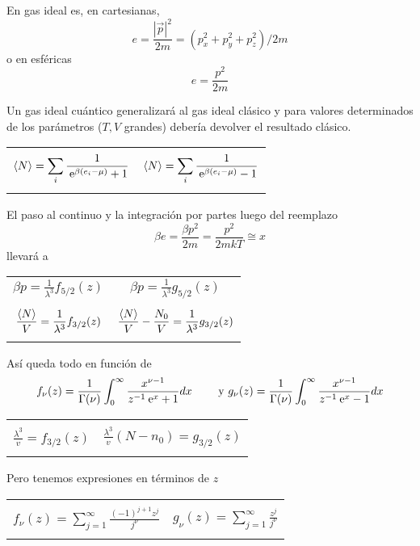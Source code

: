 \documentclass[10pt,oneside]{CBFT_book}
\begin{document}
En gas ideal es, en cartesianas, 
\[
	e = \frac{|\vec{p}|^2}{2m} = ( p_x^2 + p_y^2 + p_z^2 )/2m 
\]
o en esféricas
\[
	e = \frac{p^2}{2m} 
\]

Un gas ideal cuántico generalizará al gas ideal clásico y para valores determinados de los
parámetros ($T,V$ grandes) debería devolver el resultado clásico.
\begin{center}
\begin{tabular}{c|c}
  & \\
$ \displaystyle \braket{N} = \sum_i \frac{1}{\:\mathrm{e}^{\beta(e_i - \mu)} + 1} $ & 
$ \displaystyle \braket{N} = \sum_i \frac{1}{\:\mathrm{e}^{\beta(e_i - \mu)} - 1} $ \\
  & 
\end{tabular}
\end{center}

El paso al continuo y la integración por partes luego del reemplazo
\[
	\beta e = \frac{\beta p^2}{2m} = \frac{p^2}{2mkT} \cong x
\]
llevará a 
\begin{center}
\begin{tabular}{c|c}
$ \displaystyle \beta p = \frac{1}{\lambda^3} f_{5/2}(z) $ & 
$ \displaystyle \beta p = \frac{1}{\lambda^3} g_{5/2}(z) $ \\
  & \\
$ \displaystyle \frac{\braket{N}}{V} = \frac{1}{\lambda^3} f_{3/2}(z) $ & 
$ \displaystyle \frac{\braket{N}}{V} - \frac{N_0}{V}= \frac{1}{\lambda^3} g_{3/2}(z) $ \\
  & 
\end{tabular}
\end{center}


Así queda todo en función de 
\[
	f_\nu(z) = \frac{1}{\Gamma(\nu)} \int_0^\infty \frac{x^{\nu-1}}{z^{-1}\:\mathrm{e}^x + 1} dx \qquad \text{ y }
	g_\nu(z) = \frac{1}{\Gamma(\nu)} \int_0^\infty \frac{x^{\nu-1}}{z^{-1}\:\mathrm{e}^x - 1} dx
\]
\begin{center}
\begin{tabular}{c|c}
  & \\
$ \displaystyle \frac{\lambda^3}{v} = f_{3/2}(z) $ & 
$ \displaystyle \frac{\lambda^3}{v}( N - n_0 ) = g_{3/2}(z) $ \\
  & 
\end{tabular}
\end{center}

Pero tenemos expresiones en términos de $z$
\begin{center}
\begin{tabular}{c|c}
  & \\
$ \displaystyle f_\nu (z) = \sum_{j=1}^\infty \frac{(-1)^{j+1}z^j}{j^\nu} $ & 
$ \displaystyle g_\nu (z) = \sum_{j=1}^\infty \frac{z^j}{j^\nu}  $ \\
  & 
\end{tabular}
\end{center}
\end{document}
